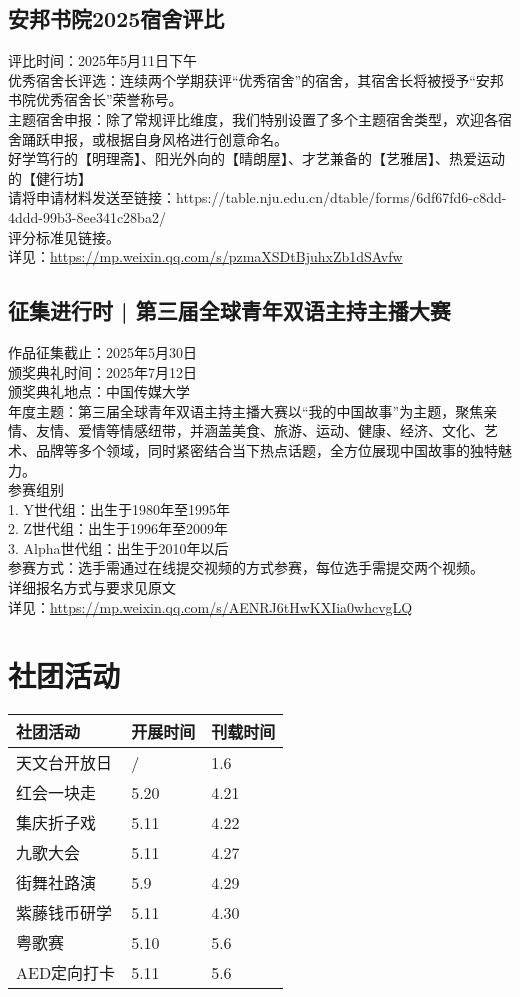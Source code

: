 \documentclass[letterpaper, 12pt]{article}
\begin{document}
\begin{multicols}{2}
\subsection{安邦书院2025宿舍评比} %
评比时间：2025年5月11日下午
\\优秀宿舍长评选：连续两个学期获评“优秀宿舍”的宿舍，其宿舍长将被授予“安邦书院优秀宿舍长”荣誉称号。
\\主题宿舍申报：除了常规评比维度，我们特别设置了多个主题宿舍类型，欢迎各宿舍踊跃申报，或根据自身风格进行创意命名。
\\好学笃行的【明理斋】、阳光外向的【晴朗屋】、才艺兼备的【艺雅居】、热爱运动的【健行坊】
\\请将申请材料发送至链接：https://table.nju.edu.cn/dtable/forms/6df67fd6-c8dd-4ddd-99b3-8ee341c28ba2/
\\评分标准见链接。
\\详见：\url{https://mp.weixin.qq.com/s/pzmaXSDtBjuhxZb1dSAvfw}
\subsection{征集进行时 | 第三届全球青年双语主持主播大赛} %
作品征集截止：2025年5月30日
\\颁奖典礼时间：2025年7月12日
\\颁奖典礼地点：中国传媒大学
\\年度主题：第三届全球青年双语主持主播大赛以“我的中国故事”为主题，聚焦亲情、友情、爱情等情感纽带，并涵盖美食、旅游、运动、健康、经济、文化、艺术、品牌等多个领域，同时紧密结合当下热点话题，全方位展现中国故事的独特魅力。
\\参赛组别
\\1. Y世代组：出生于1980年至1995年
\\2. Z世代组：出生于1996年至2009年
\\3. Alpha世代组：出生于2010年以后
\\参赛方式：选手需通过在线提交视频的方式参赛，每位选手需提交两个视频。
\\详细报名方式与要求见原文
\\详见：\url{https://mp.weixin.qq.com/s/AENRJ6tHwKXIia0whcvgLQ}
\section{社团活动}
\begin{tabular}{|>{\centering\arraybackslash}m{}|m{}|m{}|}
    \hline
    社团活动 & 开展时间 & 刊载时间\\
    \hline\hline
    天文台开放日 & / & 1.6\\
    红会一块走 & 5.20 & 4.21\\
    集庆折子戏 & 5.11 & 4.22\\
    九歌大会 & 5.11 & 4.27\\
    街舞社路演 & 5.9 & 4.29\\
    紫藤钱币研学 & 5.11 & 4.30\\
    粤歌赛 & 5.10 & 5.6\\
    AED定向打卡 & 5.11 & 5.6\\
    \hline
\end{tabular}

\end{multicols}
\end{document}
